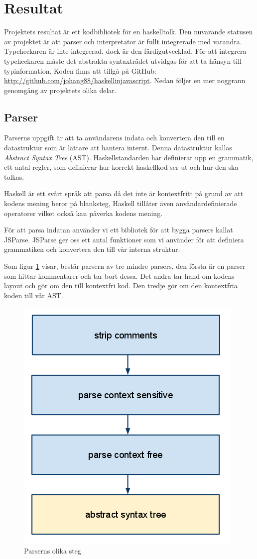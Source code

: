 \section{Resultat}

Projektets resultat är ett kodbibliotek för en haskelltolk. Den nuvarande statusen av projektet är att parser och interpretator är fullt integrerade med varandra. Typcheckaren är inte integrerad, dock är den färdigutvecklad. För att integrera typcheckaren måste det abstrakta syntaxträdet utvidgas för att ta hänsyn till typinformation. 
Koden finns att tillgå på GitHub: \url{http://github.com/johang88/haskellinjavascript}. Nedan följer en mer noggrann genomgång av projektets olika delar. 

\subsection{Parser} 
Parserns uppgift är att ta användarens indata och konvertera den till en datastruktur 
som är lättare att hantera internt. Denna datastruktur kallas \emph{Abstract Syntax Tree} (AST). 
Haskellstandarden har definierat upp en grammatik, ett antal regler, som definierar hur korrekt haskellkod ser ut och hur den ska tolkas.

Haskell är ett svårt språk att parsa då det inte är kontextfritt på grund av att kodens mening beror på blanksteg, 
Haskell tillåter även användardefinierade operatorer vilket också kan påverka kodens mening. 

För att parsa indatan använder vi ett bibliotek för att bygga parsers kallat JSParse.
JSParse ger oss ett antal funktioner som vi använder för att definiera grammatiken och konvertera den till vår interna struktur.

Som figur \ref{fig:parser_steg} visar, består parsern av tre mindre parsers, den första är en parser som hittar kommentarer och tar bort dessa. 
Det andra tar hand om kodens layout och gör om den till kontextfri kod. Den tredje gör om den kontextfria koden till vår AST.

\begin{figure}[H]
    \begin{center}
        \includegraphics[width=.5\textwidth]{parser_1.png}
        \caption{Parserns olika steg}
        \label{fig:parser_steg} %
    \end{center}
\end{figure}


